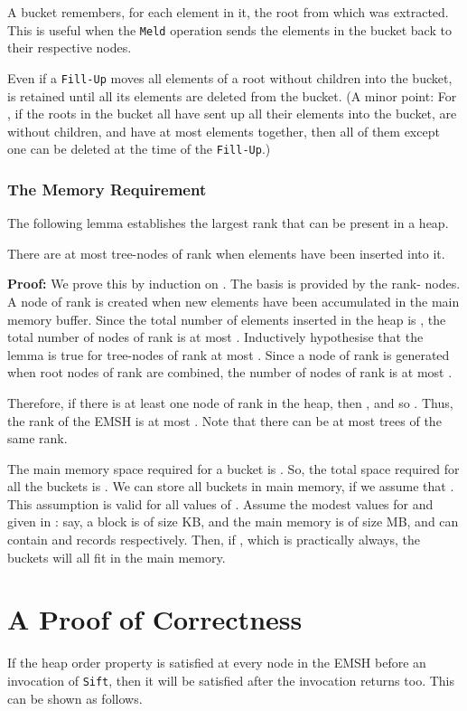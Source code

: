A bucket remembers, for each element  in it, the root from which  was extracted. 
This is useful when the {\tt Meld} operation sends the elements in the bucket back to their
respective nodes. 

Even if a {\tt Fill-Up} moves all elements of a root  without children into the bucket,
	 is retained	until all its elements are deleted from the bucket. 
(A minor point: For , if the roots in the bucket all have sent up all their
	elements into the bucket, are without children, and have at most
	 elements together, then all of them except one can be deleted at the time
	of the {\tt Fill-Up}.)

\subsubsection{The Memory Requirement}
\label{memory:requirement}
The following lemma establishes the largest rank that can be present in a 
	heap.
\begin{lemma}
\label{lem:nodesofarank}
There are at most  tree-nodes of rank  when  elements have been 
inserted into it.
\end{lemma}
{\bf Proof:}
We prove this by induction on .
The basis is provided by the rank- nodes.
A node of rank  is created when  new elements have been accumulated in 
	the main memory buffer. 
Since the total number of elements inserted in the heap is , 
	the total number of nodes of rank  is at most . 
Inductively hypothesise that the lemma is true for tree-nodes of
	rank at most . 
Since a node of rank  is generated when
	 root nodes of rank  are combined, the number of 
	nodes of rank  is at most
	.
\hfill 

Therefore, if there is at least one node of rank  in the heap, then 
, and so .
Thus, the rank of the EMSH is at most .
Note that there can be at most  trees of the same rank.

The main memory space required for a bucket is .
So, the total space required for all the buckets is
        .
We can store all buckets in main memory, if we assume that
        .
This assumption is valid for all values of .
Assume the modest values for  and  given in \cite{MR99}: say, a block is of size  KB, and the main
	memory is of size  MB, and can contain  and  records respectively.
Then, if , which is practically always, the buckets will all fit in the main memory.

\section{A Proof of Correctness}
\label{correct:emsh}
If the heap order property is satisfied at every node in the EMSH before an 
	invocation of {\tt Sift}, then it will be satisfied after the
	invocation returns too.
This can be shown as follows.

